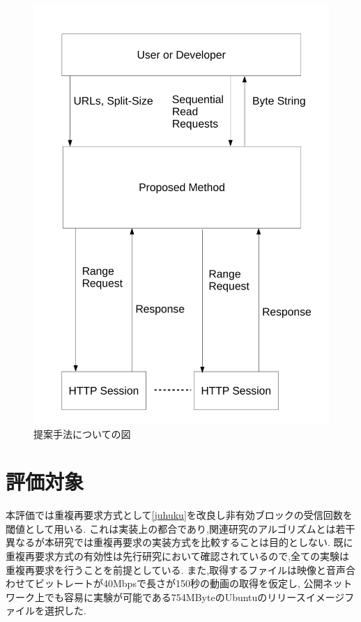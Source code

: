 \documentclass[a4j,12pt]{gradthesis_utf8}
\begin{document}
\begin{figure}[h]
	\label{sphttp}
	\begin{center}
		\includegraphics[width=15cm]{figure/sphttp.pdf}
		\caption{提案手法についての図}
	\end{center}
\end{figure}

\clearpage


\section{評価対象}
本評価では重複再要求方式として\ref{juhuku}を改良し非有効ブロックの受信回数を閾値として用いる.
これは実装上の都合であり,関連研究のアルゴリズムとは若干異なるが本研究では重複再要求の実装方式を比較することは目的としない.
既に重複再要求方式の有効性は先行研究において確認されているので,全ての実験は重複再要求を行うことを前提としている.
また,取得するファイルは映像と音声合わせてビットレートが40Mbpsで長さが150秒の動画の取得を仮定し,
公開ネットワーク上でも容易に実験が可能である754MByteのUbuntuのリリースイメージファイルを選択した.
\end{document}
